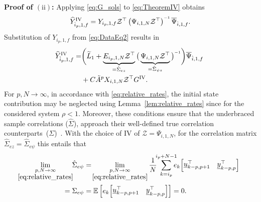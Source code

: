 \noindent\textbf{Proof of $(\mathrm{ii})$:} Applying \eqref{eq:G_sols} to \eqref{eq:TheoremIV} obtains
\begin{align}\label{eq:Yfhat_1}
    \widehat{Y}_{\hat{i}_p,1,f}^\mathrm{IV} = Y_{i_p,1,f}\mathcal{Z}^\top\left(\Psi_{i,1,N}\mathcal{Z}^\top\right)\inv\overline{\Psi}_{\hat{i},1,f}.
\end{align}
Substitution of $Y_{i_p,1,f}$ from \eqref{eq:DataEq2} results in
\begin{align}\label{eq:Yfhat_2}
    \begin{split}
        \mkern-6mu\widehat{Y}_{\hat{i}_p,1,f}^\mathrm{IV} = &\bigg(\widetilde{L}_1  + \underbrace{E_{i_p,1,N}\mathcal{Z}^\top}_{=\hat{\Sigma}_{ez}}\big(\underbrace{\Psi_{i,1,N}\mathcal{Z}^\top}_{=\hat{\Sigma}_{\psi z}}\big)\inv\bigg) \overline{\Psi}_{\hat{i},1,f}\\%
        &+ C \tilde{A}^p X_{i,1,N}\mathcal{Z}^\top G^\mathrm{IV}.
    \end{split}
\end{align}
For $p,N\rightarrow\infty$, in accordance with \eqref{eq:relative_rates}, the initial state contribution may be neglected using Lemma~\ref{lem:relative_rates} since for the considered system $\rho<1$. Moreover, these conditions ensure that the underbraced sample correlations ($\hat{\Sigma}$), approach their well-defined true correlation counterparts~($\Sigma$)~\citep{Chiuso2007,Bauer2002}. With the choice of \ac{IV} of $\mathcal{Z}=\Psi_{i,1,N}$, for the correlation matrix $\hat{\Sigma}_{ez}=\hat{\Sigma}_{e\psi}$ this entails that
\begin{align}\label{eq:E_Phi_correlation}
    \!\!\!\!\begin{split}
        \lim_{\underset{\eqref{eq:relative_rates}}{p,N\rightarrow\infty}}\!\!\hat{\Sigma}_{e\psi} &= \!\lim_{\underset{\eqref{eq:relative_rates}}{p,N\rightarrow\infty}}\frac{1}{N}\;\sum\limits_{k=i_p}^{\mathclap{i_p+N-1}} e_k\!\begin{bmatrix}\datavec{u}{k-p,p+1}^\top & \datavec{y}{k-p,p}^\top \end{bmatrix}\\
        =\Sigma_{e\psi} &=\mathbb{E}\left[e_k\!\begin{bmatrix}\datavec{u}{k-p,p+1}^\top & \datavec{y}{k-p,p}^\top \end{bmatrix}\right]=0.
    \end{split}
\end{align}

